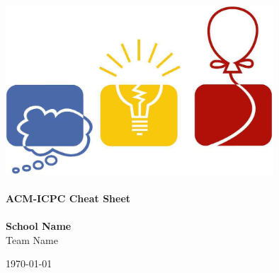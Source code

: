 \documentclass[12pt,a4paper]{article}
\begin{document}
\begin{titlepage}
\begin{center}
\vspace*{0.5cm}
\includegraphics[width=0.75\textwidth]{logo.jpg} \\ [2cm]

\HRule \\ [1cm]
\textbf{\Huge{ACM-ICPC Cheat Sheet}} \\ [0.5cm]
\HRule \\ [4cm]

\textbf{\Huge{School Name}} \\ [1cm]
\LARGE{Team Name}

\vfill
\Large{\today}
\end{center}
\clearpage

\tableofcontents
\pagestyle{empty}
\clearpage
\end{titlepage}


\end{document}
